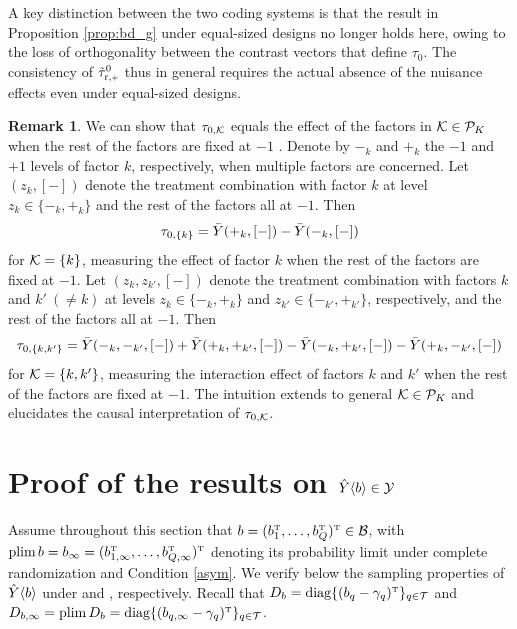 \documentclass[11pt]{article}
\theoremstyle{definition}
\newtheorem{remark}{Remark}
\begin{document}

A key distinction between the two coding systems is that the result in Proposition \ref{prop:bd_g} under equal-sized designs no longer holds here, owing to the loss of orthogonality between the contrast vectors that define $\tau_0$.
The consistency of $\ttrp^0$ thus in general requires the actual absence of the nuisance effects even under equal-sized designs. 

\begin{remark}\label{rmk:baseline weighting}
We can show that $\tau_{0, \mathcal{K}}$ equals the effect of the factors in $\mathcal{K}\in \mathcal P_K$ when the rest of the factors are fixed at $-1$ \citep{ZDa}. 
Denote by $-_k$ and $+_k$ the $-1$ and $+1$ levels of factor $k$, respectively, when multiple factors are concerned. 
Let $(z_k, [-])$ denote the treatment combination with factor $k$ at level $z_k \in \{-_k, +_k\}$ and the rest of the factors all at $-1$.
Then 
$$\tau_{0, \{k\}} =  \bar Y(+_k, [-])- \bar Y(-_k, [-])$$
for $ \mathcal{K} = \{k\}$, measuring the effect of factor $k$ when the rest of the factors are fixed at $-1$. 
Let $(z_k, z_{k'}, [-])$  denote the treatment combination with factors $k$ and $k' \ (\neq k)$ at levels $z_k\in \{-_k, +_k\}$ and $z_{k'}\in \{-_{k'}, +_{k'}\}$, respectively,  and the rest of the factors all at $-1$. 
Then 
$$
\tau_{0, \{k,k'\}} = \bar Y(-_k, -_{k'}, [-]) + \bar Y(+_k, +_{k'}, [-]) -\bar Y(-_k, +_{k'}, [-]) - \bar Y(+_k, -_{k'}, [-])$$
for $\mathcal{K} = \{k, k'\}$, measuring the interaction effect of factors $k$ and $k'$ when the rest of the factors are fixed at $-1$.
The intuition extends to general $\mathcal{K} \in \mathcal P_K$ and elucidates the causal interpretation of $\tau_{0, \mathcal{K}}$.
\end{remark}







\section{Proof of the results on  $\hat Y\langle b \rangle\in \mathcal{Y}$}\label{sec:yb_app}
Assume throughout this section that $b = (b_1^{ \mathrm{\scriptscriptstyle T} }, \dots, b_Q^{ \mathrm{\scriptscriptstyle T} })^{ \mathrm{\scriptscriptstyle T} } \in\mathcal{B}$,  with $\textup{plim\,} b = b_\infty = (b^{ \mathrm{\scriptscriptstyle T} }_{1,\infty}, \ldots, b^{ \mathrm{\scriptscriptstyle T} }_{Q, \infty})^{ \mathrm{\scriptscriptstyle T} }$ denoting its probability limit under complete randomization and Condition \ref{asym}.
We verify below the sampling properties of $\hat Y\langle b \rangle$ under {\cre} and {\rem}, respectively. 
Recall that $D_b   = \text{diag}\{(b_q - \gamma_q)^{ \mathrm{\scriptscriptstyle T} }\}_{q\in\mathcal{T}}$ and $D_{b, \infty} = \textup{plim\,} D_b= \text{diag}\{(b_{q,\infty} - \gamma_q)^{ \mathrm{\scriptscriptstyle T} }\}_{q\in\mathcal{T}}$. 
\end{document}
